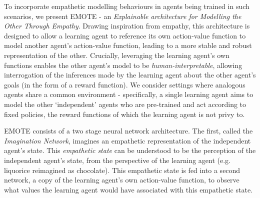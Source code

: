 To incorporate empathetic modelling behaviours 
in agents being trained in such scenarios,
we present EMOTE - an \emph{Explainable architecture for Modelling the Other Through Empathy}. Drawing inspiration from empathy, this architecture is designed to allow a learning agent to reference its own action-value function to model another agent's action-value function, leading to a more stable and robust representation of the other. Crucially, leveraging the learning agent's own functions enables the other agent's model to be \emph{human-interpretable}, allowing interrogation of the inferences made by the learning agent
about the other agent's goals (in the form of a reward function). %
We consider settings where analogous agents share a common environment - specifically, a single learning agent aims to model the other `independent' agents who are %
pre-trained and act according to fixed policies, the reward functions of which the learning agent is not privy to.

EMOTE consists of a two stage neural network architecture. The first, called the \emph{Imagination Network}, imagines an empathetic representation of the independent agent's state. This \textit{empathetic state} can be understood to be the perception of the independent agent's state, from the perspective of the learning agent (e.g. liquorice reimagined as chocolate). This empathetic state is fed into a second network, a copy of the learning agent's own action-value function, to observe what values the learning agent would have associated with this empathetic state.


